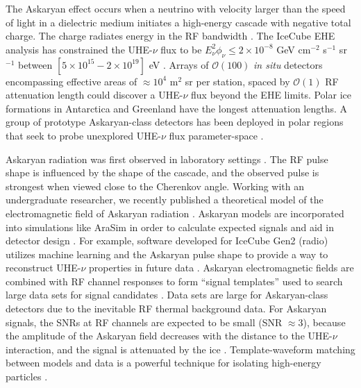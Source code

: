 \documentclass[../../main.tex]{subfiles}
\begin{document}
The Askaryan effect occurs when a neutrino with velocity larger than the speed of light in a dielectric medium initiates a high-energy cascade with negative total charge.  The charge radiates energy in the RF bandwidth \cite{askaryan1,zhs}.  The IceCube EHE analysis has constrained the UHE-$\nu$ flux to be $E_\nu^2 \phi_\nu \leq 2 \times 10^{-8}$ GeV cm$^{-2}$ s$^{-1}$ sr$^{-1}$ between $[5\times 10^{15} - 2\times 10^{19}]$ eV \cite{10.1103/physrevd.98.062003}.  Arrays of $\mathcal{O}(100)$ \textit{in situ} detectors encompassing effective areas of $\approx 10^4$ m$^2$ sr per station, spaced by $\mathcal{O}(1)$ RF attenuation length could discover a UHE-$\nu$ flux beyond the EHE limits.  Polar ice formations in Antarctica and Greenland have the longest attenuation lengths.  A group of prototype Askaryan-class detectors has been deployed in polar regions that seek to probe unexplored UHE-$\nu$ flux parameter-space \cite{rice,10.1088/1475-7516/2020/03/053,10.1103/physrevd.102.043021,10.1103/physrevd.99.122001}. \\ \vspace{2.5mm}

Askaryan radiation was first observed in laboratory settings \cite{saltzberg,10.1103/PhysRevD.74.043002,ask_ice}.  The RF pulse shape is influenced by the shape of the cascade, and the observed pulse is strongest when viewed close to the Cherenkov angle.  Working with an undergraduate researcher, we recently published a theoretical model of the electromagnetic field of Askaryan radiation \cite{PhysRevD.105.123019}. Askaryan models are incorporated into simulations like AraSim in order to calculate expected signals and aid in detector design \cite{dookayka2011characterizing,testbed,10.1140/epjc/s10052-020-7612-8}.  For example, software developed for IceCube Gen2 (radio) utilizes machine learning and the Askaryan pulse shape to provide a way to reconstruct UHE-$\nu$ properties in future data \cite{10.1140/epjc/s10052-019-6971-5,10.1088/1748-0221/15/09/p09039,IFT}.  Askaryan electromagnetic fields are combined with RF channel responses to form ``signal templates'' used to search large data sets for signal candidates \cite{10.1088/1475-7516/2020/03/053,10.1016/j.astropartphys.2014.09.002}.  Data sets are large for Askaryan-class detectors due to the inevitable RF thermal background data.  For Askaryan signals, the SNRs at RF channels are expected to be small (SNR $\approx 3$), because the amplitude of the Askaryan field decreases with the distance to the UHE-$\nu$ interaction, and the signal is attenuated by the ice \cite{10.3189/2015jog14j214,Barwick:2018497,ALLISON201963}.  Template-waveform matching between models and data is a powerful technique for isolating high-energy particles \cite{10.1016/j.astropartphys.2015.04.002,10.1016/j.astropartphys.2014.09.002,barwick2016radio}. \\ \vspace{2.5mm}
\end{document}
